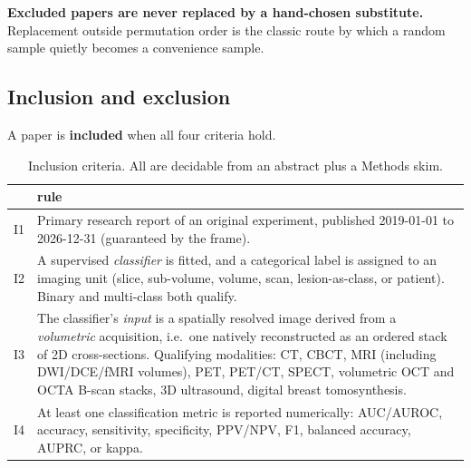 \documentclass[11pt,a4paper]{article}
\begin{document}
\textbf{Excluded papers are never replaced by a hand-chosen substitute.} Replacement
outside permutation order is the classic route by which a random sample quietly
becomes a convenience sample.

\subsection{Inclusion and exclusion}

A paper is \textbf{included} when all four criteria hold.

\begin{table}[htbp]
\centering
\caption{Inclusion criteria. All are decidable from an abstract plus a Methods skim.}
\small
\begin{tabular}{@{}lL{12.6cm}@{}}
\toprule
& rule \\
\midrule
I1 & Primary research report of an original experiment, published 2019-01-01 to 2026-12-31 (guaranteed by the frame). \\
I2 & A supervised \emph{classifier} is fitted, and a categorical label is assigned to an imaging unit (slice, sub-volume, volume, scan, lesion-as-class, or patient). Binary and multi-class both qualify. \\
I3 & The classifier's \emph{input} is a spatially resolved image derived from a \emph{volumetric} acquisition, i.e.\ one natively reconstructed as an ordered stack of 2D cross-sections. Qualifying modalities: CT, CBCT, MRI (including DWI/DCE/fMRI volumes), PET, PET/CT, SPECT, volumetric OCT and OCTA B-scan stacks, 3D ultrasound, digital breast tomosynthesis. \\
I4 & At least one classification metric is reported numerically: AUC/AUROC, accuracy, sensitivity, specificity, PPV/NPV, F1, balanced accuracy, AUPRC, or kappa. \\
\bottomrule
\end{tabular}
\end{table}
\end{document}

